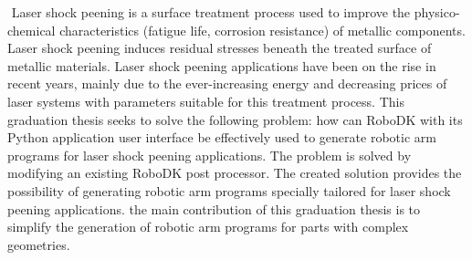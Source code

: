 ﻿%
﻿
Laser shock peening is a surface treatment process used to improve the physico-chemical characteristics (fatigue life, corrosion resistance) of metallic components. Laser shock peening induces residual stresses beneath the treated surface of metallic materials. Laser shock peening applications have been on the rise in recent years, mainly due to the ever-increasing energy and decreasing prices of laser systems with parameters suitable for this treatment process. This graduation thesis seeks to solve the following problem: how can RoboDK with its Python application user interface be effectively used to generate robotic arm programs for laser shock peening applications. The problem is solved by modifying an existing RoboDK post processor. The created solution provides the possibility of generating robotic arm programs specially tailored for laser shock peening applications.  the main contribution of this graduation thesis is to simplify the generation of robotic arm programs for parts with complex geometries.


